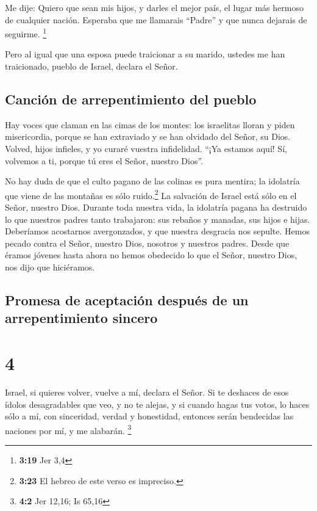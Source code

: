  Me dije: Quiero que sean mis hijos, y darles el mejor
país, el lugar más hermoso de cualquier nación. Esperaba que me
llamarais ``Padre'' y que nunca dejarais de seguirme. \footnote{\textbf{3:19}
  Jer 3,4}

 Pero al igual que una esposa puede traicionar a su
marido, ustedes me han traicionado, pueblo de Israel, declara el Señor.

\hypertarget{canciuxf3n-de-arrepentimiento-del-pueblo}{%
\subsection{Canción de arrepentimiento del
pueblo}\label{canciuxf3n-de-arrepentimiento-del-pueblo}}

 Hay voces que claman en las cimas de los montes: los
israelitas lloran y piden misericordia, porque se han extraviado y se
han olvidado del Señor, su Dios.  Volved, hijos infieles,
y yo curaré vuestra infidelidad. ``¡Ya estamos aquí! Sí, volvemos a ti,
porque tú eres el Señor, nuestro Dios''.

 No hay duda de que el culto pagano de las colinas es
pura mentira; la idolatría que viene de las montañas es sólo
ruido.\footnote{\textbf{3:23} El hebreo de este verso es impreciso.} La
salvación de Israel está sólo en el Señor, nuestro Dios. 
Durante toda nuestra vida, la idolatría pagana ha destruido lo que
nuestros padres tanto trabajaron: sus rebaños y manadas, sus hijos e
hijas.  Deberíamos acostarnos avergonzados, y que nuestra
desgracia nos sepulte. Hemos pecado contra el Señor, nuestro Dios,
nosotros y nuestros padres. Desde que éramos jóvenes hasta ahora no
hemos obedecido lo que el Señor, nuestro Dios, nos dijo que hiciéramos.

\hypertarget{promesa-de-aceptaciuxf3n-despuuxe9s-de-un-arrepentimiento-sincero}{%
\subsection{Promesa de aceptación después de un arrepentimiento
sincero}\label{promesa-de-aceptaciuxf3n-despuuxe9s-de-un-arrepentimiento-sincero}}

\hypertarget{section-3}{%
\section{4}\label{section-3}}

 Israel, si quieres volver, vuelve a mí, declara el Señor.
Si te deshaces de esos ídolos desagradables que veo, y no te alejas,
 y si cuando hagas tus votos, lo haces sólo a mí, con
sinceridad, verdad y honestidad, entonces serán bendecidas las naciones
por mí, y me alabarán. \footnote{\textbf{4:2} Jer 12,16; Is 65,16}

